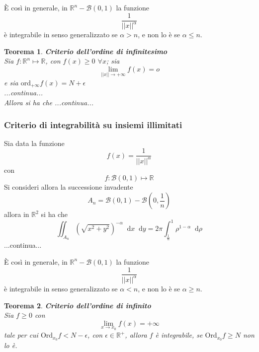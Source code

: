 \documentclass[a4paper]{extarticle}
\newtheorem{theorem}{Teorema}[section]
\newcommand*\dif{\mathop{}\!\mathrm{d}}
\begin{document}
\vspace{1em}
\noindent
È così in generale, in $\mathbb{R}^n - \mathcal{B}(0,1)$ la funzione
\[\dfrac{1}{\vert \vert x \vert \vert^\alpha}\]
è integrabile in senso generalizzato se $\alpha > n$, e non lo è se $\alpha \leq n$.

\vspace{2em}
\begin{theorem}\textbf{Criterio dell'ordine di infinitesimo}\\
    Sia $f : \mathbb{R}^n \longmapsto \mathbb{R}$, con $f(x) \geq 0$ $\forall x$; sia
    \[\lim_{\vert \vert x \vert \vert \to +\infty} f(x) = o\]
    e sia $\text{ord}_{+\infty} f(x) = N+\epsilon$\\
    ...continua...\\
    Allora si ha che ...continua...\\

\end{theorem}

\vspace{1em}
\subsubsection{Criterio di integrabilità su insiemi illimitati}
Sia data la funzione
\[f(x) = \dfrac{1}{\vert \vert x \vert \vert^\alpha}\]
con
\[f : \mathcal{B}(0,1) \longmapsto \mathbb{R}\]
Si consideri allora la successione invadente
\[A_n = \mathcal{B}(0,1) - \mathcal{B} \left(0,\dfrac{1}{n}\right)\]
allora in $\mathbb{R}^2$ si ha che
\[\iint_{A_n} \left(\sqrt{x^2+y^2}\right)^{-\alpha} \dif x \dif y = 2\pi \int_{\frac{1}{n}}^1 \rho^{1-\alpha} \dif \rho\]
...continua...

\vspace{1em}
\noindent
È così in generale, in $\mathbb{R}^n - \mathcal{B}(0,1)$ la funzione
\[\dfrac{1}{\vert \vert x \vert \vert^\alpha}\]
è integrabile in senso generalizzato se $\alpha < n$, e non lo è se $\alpha \geq n$.

\vspace{2em}
\begin{theorem}\textbf{Criterio dell'ordine di infinito}\\
    Sia $f \geq 0$ con
    \[\lim_{x \to x_0} f(x) = +\infty\]
    tale per cui $\text{Ord}_{x_0} f < N-\epsilon$, con $\epsilon \in \mathbb{R}^+$, allora $f$ è integrabile, se $\text{Ord}_{x_0} f \geq N$ non lo è.
\end{theorem}
\end{document}

